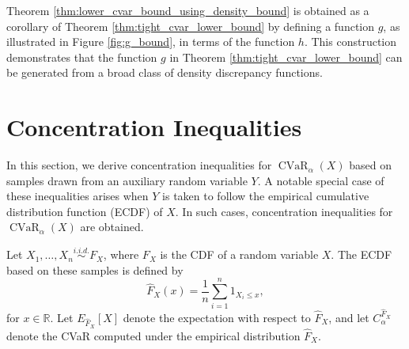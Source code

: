 \documentclass[letterpaper]{article} %
\begin{document}
Theorem \ref{thm:lower_cvar_bound_using_density_bound} is obtained as a corollary of Theorem \ref{thm:tight_cvar_lower_bound} by defining a function $g$, as illustrated in Figure \ref{fig:g_bound}, in terms of the function $h$. This construction demonstrates that the function $g$ in Theorem \ref{thm:tight_cvar_lower_bound} can be generated from a broad class of density discrepancy functions.

\section{Concentration Inequalities}\label{sec:con_ineq}
\addtocounter{section}{1}
In this section, we derive concentration inequalities for $\operatorname{CVaR}_\alpha(X)$ based on samples drawn from an auxiliary random variable $Y$. A notable special case of these inequalities arises when $Y$ is taken to follow the empirical cumulative distribution function (ECDF) of $X$. In such cases, concentration inequalities for $\operatorname{CVaR}_\alpha(X)$ are obtained.

Let $X_1, \ldots, X_n \overset{i.i.d.}{\sim} F_X$, where $F_X$ is the CDF of a random variable $X$. The ECDF based on these samples is defined by
\begin{equation}
	\hat{F}_X(x)=\frac{1}{n} \sum_{i=1}^n 1_{X_i\leq x},
\end{equation}
for $x\in \mathbb{R}$. Let $E_{\hat{F}_X}[X]$ denote the expectation with respect to $\hat{F}_X$, and let $C_\alpha^{\hat{F}_X}$ denote the CVaR computed under the empirical distribution $\hat{F}_X$.
\end{document}
